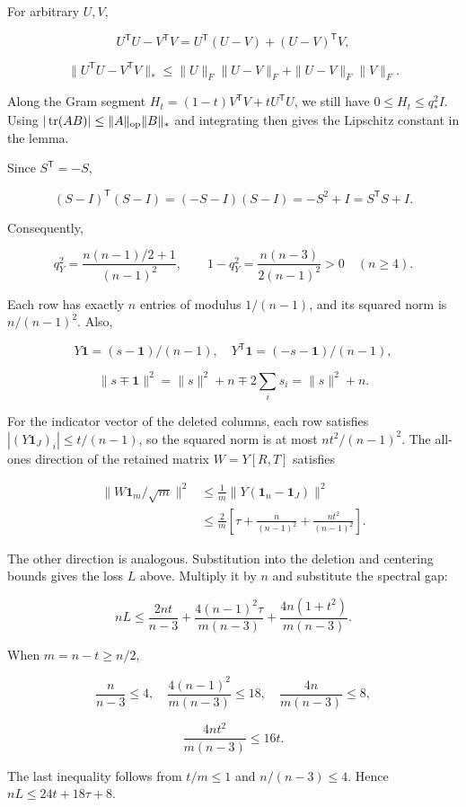 \documentclass[11pt,a4paper]{article}
\begin{document}
For arbitrary \(U,V\),

\[
U^{\mathsf T}U-V^{\mathsf T}V
=U^{\mathsf T}(U-V)+(U-V)^{\mathsf T}V,
\]

\[
\|U^{\mathsf T}U-V^{\mathsf T}V\|_*
\le\|U\|_F\|U-V\|_F+\|U-V\|_F\|V\|_F.
\]

Along the Gram segment \(H_t=(1-t)V^{\mathsf T}V+tU^{\mathsf T}U\), we still have \(0\le H_t\le q_*^2I\). Using \(|\operatorname{tr}(AB)|\le\|A\|_{\rm op}\|B\|_*\) and integrating then gives the Lipschitz constant in the lemma.

Since \(S^{\mathsf T}=-S\),

\[
(S-I)^{\mathsf T}(S-I)=(-S-I)(S-I)=-S^2+I=S^{\mathsf T}S+I.
\]

Consequently,

\[
q_Y^2=\frac{n(n-1)/2+1}{(n-1)^2},\qquad
1-q_Y^2=\frac{n(n-3)}{2(n-1)^2}>0\quad(n\ge4).
\]

Each row has exactly \(n\) entries of modulus \(1/(n-1)\), and its squared norm is \(n/(n-1)^2\). Also,

\[
Y\mathbf1=(s-\mathbf1)/(n-1),\quad
Y^{\mathsf T}\mathbf1=(-s-\mathbf1)/(n-1),
\]

\[
\|s\mp\mathbf1\|^2=\|s\|^2+n\mp2\sum_i s_i=\|s\|^2+n.
\]

For the indicator vector of the deleted columns, each row satisfies \(|(Y\mathbf1_J)_i|\le t/(n-1)\), so the squared norm is at most \(nt^2/(n-1)^2\). The all-ones direction of the retained matrix \(W=Y[R,T]\) satisfies

\[
\begin{aligned}
\|W\mathbf1_m/\sqrt m\|^2
&\le\frac1m\|Y(\mathbf1_n-\mathbf1_J)\|^2\\
&\le\frac2m\left[\tau+\frac n{(n-1)^2}+\frac{nt^2}{(n-1)^2}\right].
\end{aligned}
\]

The other direction is analogous. Substitution into the deletion and centering bounds gives the loss \(L\) above. Multiply it by \(n\) and substitute the spectral gap:

\[
nL\le\frac{2nt}{n-3}
+\frac{4(n-1)^2\tau}{m(n-3)}
+\frac{4n(1+t^2)}{m(n-3)}.
\]

When \(m=n-t\ge n/2\),

\[
\frac n{n-3}\le4,\quad
\frac{4(n-1)^2}{m(n-3)}\le18,\quad
\frac{4n}{m(n-3)}\le8,
\]

\[
\frac{4nt^2}{m(n-3)}\le16t.
\]

The last inequality follows from \(t/m\le1\) and \(n/(n-3)\le4\). Hence \(nL\le24t+18\tau+8\).
\end{document}
